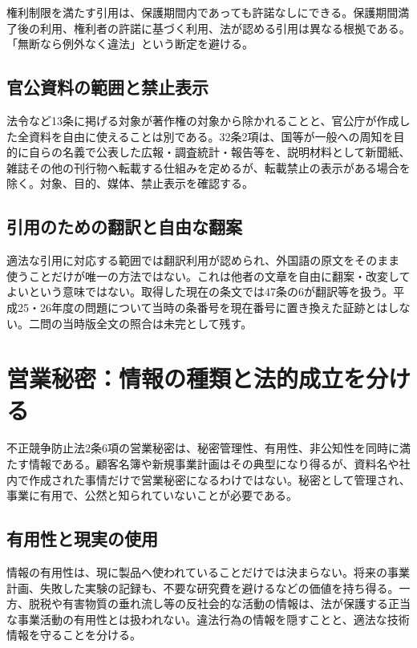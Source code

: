 権利制限を満たす引用は、保護期間内であっても許諾なしにできる。保護期間満了後の利用、権利者の許諾に基づく利用、法が認める引用は異なる根拠である。「無断なら例外なく違法」という断定を避ける。

\subsection{官公資料の範囲と禁止表示}
\label{theory:ip:government}
法令など13条に掲げる対象が著作権の対象から除かれることと、官公庁が作成した全資料を自由に使えることは別である。32条2項は、国等が一般への周知を目的に自らの名義で公表した広報・調査統計・報告等を、説明材料として新聞紙、雑誌その他の刊行物へ転載する仕組みを定めるが、転載禁止の表示がある場合を除く。対象、目的、媒体、禁止表示を確認する\parencite{ip_copyright_statute}。

\subsection{引用のための翻訳と自由な翻案}
\label{theory:ip:translation}
適法な引用に対応する範囲では翻訳利用が認められ、外国語の原文をそのまま使うことだけが唯一の方法ではない。これは他者の文章を自由に翻案・改変してよいという意味ではない。取得した現在の条文では47条の6が翻訳等を扱う。平成25・26年度の問題について当時の条番号を現在番号に置き換えた証跡とはしない。二問の当時版全文の照合は未完として残す。

\section{営業秘密：情報の種類と法的成立を分ける}
\label{theory:ip:secret}
不正競争防止法2条6項の営業秘密は、秘密管理性、有用性、非公知性を同時に満たす情報である\parencite{ip_unfair_statute}。顧客名簿や新規事業計画はその典型になり得るが、資料名や社内で作成された事情だけで営業秘密になるわけではない。秘密として管理され、事業に有用で、公然と知られていないことが必要である。

\subsection{有用性と現実の使用}
\label{theory:ip:usefulness}
情報の有用性は、現に製品へ使われていることだけでは決まらない。将来の事業計画、失敗した実験の記録も、不要な研究費を避けるなどの価値を持ち得る。一方、脱税や有害物質の垂れ流し等の反社会的な活動の情報は、法が保護する正当な事業活動の有用性とは扱われない\parencite{ip_secret_handbook2017,ip_secret_commentary2018}。違法行為の情報を隠すことと、適法な技術情報を守ることを分ける。

